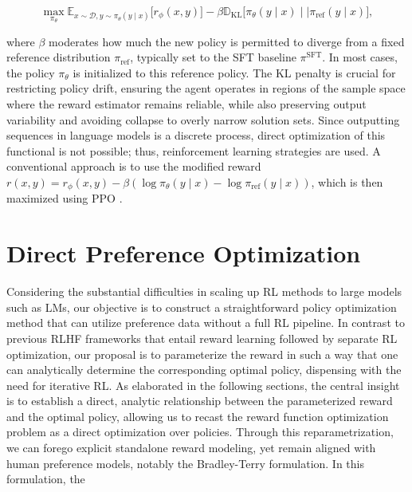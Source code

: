 \begin{equation}\label{eq:RL}
\max_{\pi_{\theta}}  \mathbb{E}_{x\sim \mathcal{D}, y\sim \pi_{\theta}(y \mid x)}\bigl[r_{\phi}(x, y)\bigr] - \beta\mathbb{D}_{\textrm{KL}}\bigl[\pi_{\theta}(y\mid x)\mid \mid \pi_\text{ref}(y\mid x)\bigr],
\end{equation}

where $\beta$ moderates how much the new policy is permitted to diverge from a fixed reference distribution $\pi_\text{ref}$, typically set to the SFT baseline $\pi^\text{SFT}$. In most cases, the policy $\pi_\theta$ is initialized to this reference policy. The KL penalty is crucial for restricting policy drift, ensuring the agent operates in regions of the sample space where the reward estimator remains reliable, while also preserving output variability and avoiding collapse to overly narrow solution sets. Since outputting sequences in language models is a discrete process, direct optimization of this functional is not possible; thus, reinforcement learning strategies are used. A conventional approach \citep{ziegler2020finetuning, stiennon2022learning, bai2022training, ouyang2022training} is to use the modified reward $r(x, y) = r_{\phi}(x, y) -\beta (\log \pi_{\theta}(y\mid x) - \log \pi_\text{ref}(y\mid x))$, which is then maximized using PPO \cite{schulman2017proximal}.

\section{Direct Preference Optimization}\label{sec:DPO}

Considering the substantial difficulties in scaling up RL methods to large models such as LMs, our objective is to construct a straightforward policy optimization method that can utilize preference data without a full RL pipeline. In contrast to previous RLHF frameworks that entail reward learning followed by separate RL optimization, our proposal is to parameterize the reward in such a way that one can analytically determine the corresponding optimal policy, dispensing with the need for iterative RL. As elaborated in the following sections, the central insight is to establish a direct, analytic relationship between the parameterized reward and the optimal policy, allowing us to recast the reward function optimization problem as a direct optimization over policies. Through this reparametrization, we can forego explicit standalone reward modeling, yet remain aligned with human preference models, notably the Bradley-Terry formulation. In this formulation, the

